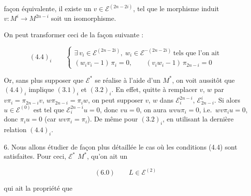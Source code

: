 
façon équivalente, il existe un $v \in \mathcal{E}^{(2n-2i)}$, tel que le morphisme
induit $v \colon M^{i} \to M^{2n-i}$ soit un isomorphisme.

On peut transformer ceci de la façon suivante :

\[ (4.4)_{i} \qquad \begin{cases} \exists\, v_{i} \in \mathcal{E}^{(2n-2i)},\ w_{i} \in \mathcal{E}^{-(2n-2i)} \ \text{tels que l'on ait} \\[2pt] (w_{i} v_{i} - 1)\, \pi_{i} = 0 , \qquad (v_{i} w_{i} - 1)\, \pi_{2n-i} = 0 \end{cases} \]

Or, sans plus supposer que $\mathcal{E}^{*}$ se réalise à l'aide d'un $M^{*}$,
on voit aussitôt que $(4.4)_{i}$ implique $(3.1)_{i}$ et $(3.2)_{i}$. En effet,
quitte à remplacer $v$, $w$ par $v \pi_{i} = \pi_{2n-i} v$,
$w \pi_{2n-i} = \pi_{i} w$, on peut supposer $v$, $w$ dans
$\mathcal{E}^{2n-i}_{i}$, $\mathcal{E}^{i}_{2n-i}$. Si alors
 $u \in \mathcal{E}^{(0)}$ est tel que
$\mathcal{E}^{2n-i}_{i} u = 0$, donc $v u = 0$, on aura
$w v u \pi_{i} = 0$, i.e.\ $w v \pi_{i} u = 0$, donc $\pi_{i} u = 0$ (car
$w v \pi_{i} = \pi_{i}$). De même pour $(3.2)_{i}$, en utilisant la dernière
relation $(4.4)_{i}$.


6. Nous allons étudier de façon plus détaillée le cas où les conditions (4.4)
sont satisfaites. Pour ceci,  $\mathcal{E}^{*}$  \ill{} $M^{*}$,
 qu'on ait un

\[ (6.0) \qquad L \in \mathcal{E}^{(2)} \]

qui ait la propriété que

